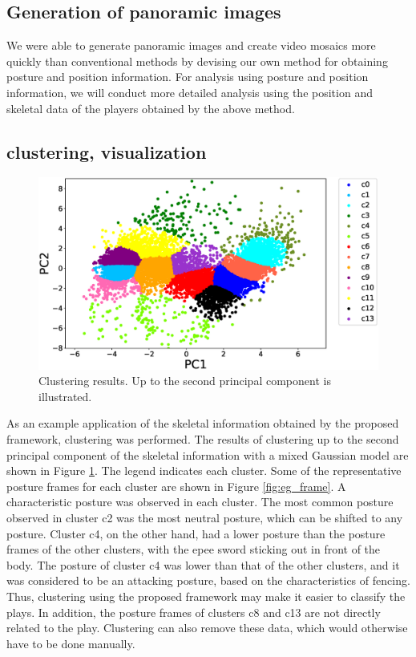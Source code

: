 
\subsection{Generation of panoramic images}
We were able to generate panoramic images and create video mosaics more quickly than conventional methods by devising our own method for obtaining posture and position information. For analysis using posture and position information, we will conduct more detailed analysis using the position and skeletal data of the players obtained by the above method.

\subsection{clustering, visualization}

\begin{figure}
    \centering
    \includegraphics[width=\columnwidth]{images/fencing/gmm.eps}
    \caption{Clustering results. Up to the second principal component is illustrated.}
    \label{fig:gmm_result}
\end{figure}

As an example application of the skeletal information obtained by the proposed framework, clustering was performed.
The results of clustering up to the second principal component of the skeletal information with a mixed Gaussian model are shown in Figure \ref{fig:gmm_result}.
The legend indicates each cluster.
Some of the representative posture frames for each cluster are shown in Figure \ref{fig:eg_frame}.
A characteristic posture was observed in each cluster.
The most common posture observed in cluster c2 was the most neutral posture, which can be shifted to any posture.
Cluster c4, on the other hand, had a lower posture than the posture frames of the other clusters, with the epee sword sticking out in front of the body.
The posture of cluster c4 was lower than that of the other clusters, and it was considered to be an attacking posture, based on the characteristics of fencing.
Thus, clustering using the proposed framework may make it easier to classify the plays.
In addition, the posture frames of clusters c8 and c13 are not directly related to the play.
Clustering can also remove these data, which would otherwise have to be done manually.


